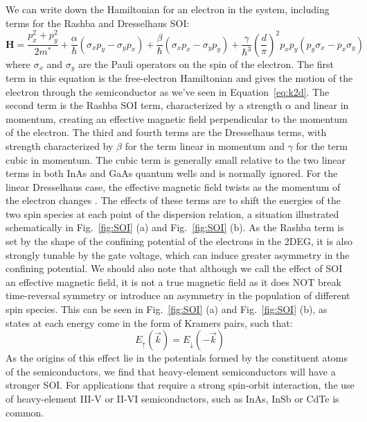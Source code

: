 We can write down the Hamiltonian for an electron in the system, including terms for the Rashba and Dresselhaus SOI:
\begin{equation}
  \mathbf{H} = \frac{p_x^2 + p_y^2}{2m^*} + \frac{\alpha}{\hbar}(\sigma_xp_y - \sigma_yp_x) + \frac{\beta}{\hbar}(\sigma_x p_x - \sigma_y p_y) +
  \frac{\gamma}{\hbar^3}\left(\frac{d}{\pi}\right)^2 p_x p_y (p_y\sigma_x-p_x\sigma_y)
\end{equation}
where $\sigma_x$ and $\sigma_y$ are the Pauli operators on the spin of the electron. The first term in this equation is the free-electron Hamiltonian and gives the motion of the electron through the semiconductor as we've seen in Equation~\ref{eq:k2d}. The second term is the Rashba SOI term, characterized
by a strength $\alpha$ and linear in momentum, creating an effective magnetic field perpendicular to the momentum of the electron. The third and fourth terms
are the Dresselhaus terms, with strength characterized by $\beta$ for the term linear in momentum and $\gamma$ for the term cubic in momentum. The cubic term is
generally small relative to the two linear terms in both InAs and GaAs quantum wells and is normally ignored. For the linear Dresselhaus case, the effective magnetic field twists
as the momentum of the electron changes \cite{PhysRev.100.580}. The effects of these terms are to shift the energies of the two spin species at each point of the dispersion
relation, a situation illustrated schematically in Fig.~\ref{fig:SOI} (a) and Fig.~\ref{fig:SOI} (b). As the Rashba term is set by the shape
of the confining potential of the electrons in the 2DEG, it is also strongly tunable by the gate voltage, which can induce greater asymmetry in the confining potential.
We should also note that although we call the effect of SOI an effective magnetic field, it is not a true magnetic field as
it does NOT break time-reversal symmetry or introduce an asymmetry in the population of different spin species. This can be seen in
Fig.~\ref{fig:SOI} (a) and Fig.~\ref{fig:SOI} (b), as states at each energy come in the form of Kramers pairs, such that:
\begin{equation}
  E_\uparrow(\vec k) = E_\downarrow(-\vec k)
\end{equation}
As the origins of this effect lie in the potentials formed by the constituent atoms of the semiconductors, we find that heavy-element semiconductors
will have a stronger SOI. For applications that require a strong spin-orbit interaction, the use of heavy-element III-V or II-VI semiconductors, such
as InAs, InSb or CdTe is common.

